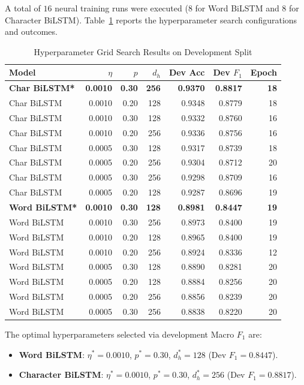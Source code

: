 \documentclass[conference]{IEEEtran}
\begin{document}
A total of $16$ neural training runs were executed ($8$ for Word BiLSTM and $8$ for Character BiLSTM). Table~\ref{tab:tuning_grid} reports the hyperparameter search configurations and outcomes.

\begin{table}[!t]
\caption{Hyperparameter Grid Search Results on Development Split}
\label{tab:tuning_grid}
\centering
\small
\setlength{\tabcolsep}{3.5pt}
\begin{tabular}{lrrrrrr}
\toprule
\textbf{Model} & $\eta$ & $p$ & $d_h$ & \textbf{Dev Acc} & \textbf{Dev $F_1$} & \textbf{Epoch} \\
\midrule
\textbf{Char BiLSTM*} & \textbf{0.0010} & \textbf{0.30} & \textbf{256} & \textbf{0.9370} & \textbf{0.8817} & \textbf{18} \\
Char BiLSTM & 0.0010 & 0.20 & 128 & 0.9348 & 0.8779 & 18 \\
Char BiLSTM & 0.0010 & 0.30 & 128 & 0.9332 & 0.8760 & 16 \\
Char BiLSTM & 0.0010 & 0.20 & 256 & 0.9336 & 0.8756 & 16 \\
Char BiLSTM & 0.0005 & 0.30 & 128 & 0.9317 & 0.8739 & 18 \\
Char BiLSTM & 0.0005 & 0.20 & 256 & 0.9304 & 0.8712 & 20 \\
Char BiLSTM & 0.0005 & 0.30 & 256 & 0.9298 & 0.8709 & 16 \\
Char BiLSTM & 0.0005 & 0.20 & 128 & 0.9287 & 0.8696 & 19 \\
\midrule
\textbf{Word BiLSTM*} & \textbf{0.0010} & \textbf{0.30} & \textbf{128} & \textbf{0.8981} & \textbf{0.8447} & \textbf{19} \\
Word BiLSTM & 0.0010 & 0.30 & 256 & 0.8973 & 0.8400 & 19 \\
Word BiLSTM & 0.0010 & 0.20 & 128 & 0.8965 & 0.8400 & 19 \\
Word BiLSTM & 0.0010 & 0.20 & 256 & 0.8924 & 0.8336 & 12 \\
Word BiLSTM & 0.0005 & 0.30 & 128 & 0.8890 & 0.8281 & 20 \\
Word BiLSTM & 0.0005 & 0.20 & 128 & 0.8884 & 0.8256 & 20 \\
Word BiLSTM & 0.0005 & 0.20 & 256 & 0.8856 & 0.8239 & 20 \\
Word BiLSTM & 0.0005 & 0.30 & 256 & 0.8838 & 0.8220 & 20 \\
\bottomrule
\end{tabular}
\end{table}

The optimal hyperparameters selected via development Macro $F_1$ are:
\begin{itemize}
    \item \textbf{Word BiLSTM}: $\eta^* = 0.0010$, $p^* = 0.30$, $d_h^* = 128$ ($\text{Dev } F_1 = 0.8447$).
    \item \textbf{Character BiLSTM}: $\eta^* = 0.0010$, $p^* = 0.30$, $d_h^* = 256$ ($\text{Dev } F_1 = \mathbf{0.8817}$).
\end{itemize}
\end{document}
